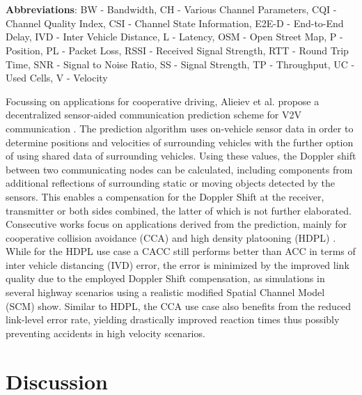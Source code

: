 \documentclass[conference]{IEEEtran}
\begin{document}
\begin{table*}[!htbp]
\begin{tabular}
\\
    \bottomrule
  \end{tabular}
  \medskip\\
  \textbf{Abbreviations}: BW - Bandwidth, CH - Various Channel Parameters, CQI - Channel Quality Index, CSI - Channel State Information, E2E-D - End-to-End Delay, IVD - Inter Vehicle Distance, L - Latency, OSM - Open Street Map, P - Position, PL - Packet Loss, RSSI - Received Signal Strength, RTT - Round Trip Time, SNR - Signal to Noise Ratio, SS - Signal Strength, TP - Throughput, UC - Used Cells, V - Velocity
\end{table*}

Focussing on applications for cooperative driving, Alieiev et al. propose a decentralized sensor-aided communication prediction scheme for V2V communication \cite{alieievSensorbasedCommunicationPrediction2017,alieievPredictiveCommunicationIts2018}. The prediction algorithm uses on-vehicle sensor data in order to determine positions and velocities of surrounding vehicles with the further option of using shared data of surrounding vehicles. Using these values, the Doppler shift between two communicating nodes can be calculated, including components from additional reflections of surrounding static or moving objects detected by the sensors. This enables a compensation for the Doppler Shift at the receiver, transmitter or both sides combined, the latter of which is not further elaborated.\\
Consecutive works focus on applications derived from the prediction, mainly for cooperative collision avoidance (CCA) \cite{jornodEnvironmentAwareCommunicationsCooperative2018} and high density platooning (HDPL) \cite{alieievImprovingPerformanceHighDensity2020}.\\
While for the HDPL use case a CACC still performs better than ACC in terms of inter vehicle distancing (IVD) error, the error is minimized by the improved link quality due to the employed Doppler Shift compensation, as simulations in several highway scenarios using a realistic modified Spatial Channel Model (SCM) show. Similar to HDPL, the CCA use case also benefits from the reduced link-level error rate, yielding drastically improved reaction times thus possibly preventing accidents in high velocity scenarios.

\section{Discussion}\label{sec:discussion}
\end{document}
